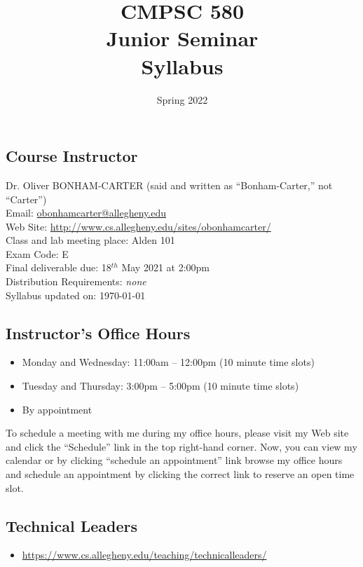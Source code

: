 \documentclass[11pt]{article} %
\title{\textbf{CMPSC 580\\ Junior Seminar\\Syllabus}}
\author{Spring 2022}
\date{} %
\begin{document}
\maketitle

\subsection*{\textbf{Course Instructor}}
Dr. Oliver BONHAM-CARTER (said and written as ``Bonham-Carter,'' not “Carter'')\\
\noindent Email: \url{obonhamcarter@allegheny.edu} \\
\noindent Web Site: \url{http://www.cs.allegheny.edu/sites/obonhamcarter/} \\
\noindent Class and lab meeting place: Alden 101\\
\noindent Exam Code: E\\
\noindent Final deliverable due: 18$^{th}$ May 2021 at 2:00pm\\
\noindent Distribution Requirements: \emph{none}\\
\noindent Syllabus updated on: \today\\


\subsection*{\textbf{Instructor's Office Hours}}

\begin{itemize}
  \itemsep 0em
  \item Monday and Wednesday: 11:00am -- 12:00pm (10 minute time slots)
  \item Tuesday and Thursday: 3:00pm -- 5:00pm (10 minute time slots)
  \item By appointment
\end{itemize}


\noindent
To schedule a meeting with me during my office hours, please visit my Web site and click the ``Schedule'' link in the top right-hand corner. Now, you can view my calendar or by clicking ``schedule an appointment'' link browse my office hours and schedule an appointment by clicking the correct link to reserve an open time slot. 


\subsection*{\textbf{Technical Leaders}}
	\begin{itemize}
		\item   \url{https://www.cs.allegheny.edu/teaching/technicalleaders/}
	\end{itemize}
\end{document}
